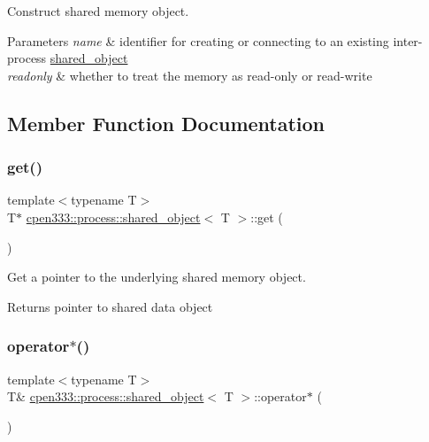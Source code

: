 Construct shared memory object. 


\begin{DoxyParams}{Parameters}
{\em name} & identifier for creating or connecting to an existing inter-\/process \hyperlink{classcpen333_1_1process_1_1shared__object}{shared\+\_\+object} \\
\hline
{\em readonly} & whether to treat the memory as read-\/only or read-\/write \\
\hline
\end{DoxyParams}


\subsection{Member Function Documentation}
\mbox{\label{classcpen333_1_1process_1_1shared__object_ac6d38c3ca35cfb102905b6e9dbe4b1ce}} 
\subsubsection{\texorpdfstring{get()}{get()}}
{\footnotesize\ttfamily template$<$typename T$>$ \\
T$\ast$ \hyperlink{classcpen333_1_1process_1_1shared__object}{cpen333\+::process\+::shared\+\_\+object}$<$ T $>$\+::get (\begin{DoxyParamCaption}{ }\end{DoxyParamCaption})\hspace{0.3cm}{\ttfamily [inline]}}



Get a pointer to the underlying shared memory object. 

\begin{DoxyReturn}{Returns}
pointer to shared data object 
\end{DoxyReturn}
\mbox{\label{classcpen333_1_1process_1_1shared__object_ad1ffd4ad5e13a87f27d9253b816b0b9f}} 
\subsubsection{\texorpdfstring{operator$\ast$()}{operator*()}}
{\footnotesize\ttfamily template$<$typename T$>$ \\
T\& \hyperlink{classcpen333_1_1process_1_1shared__object}{cpen333\+::process\+::shared\+\_\+object}$<$ T $>$\+::operator$\ast$ (\begin{DoxyParamCaption}{ }\end{DoxyParamCaption})\hspace{0.3cm}{\ttfamily [inline]}}



